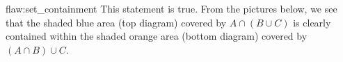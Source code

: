 \begin{flaw}{flaw:set_containment} 
This statement is true. From the pictures below, we see that the shaded blue area (top diagram) covered by $A \cap (B \cup C)$ is clearly contained within the shaded orange area (bottom diagram) covered by $(A \cap B) \cup C$.

\def\firstcircle{(0,0) circle (1.5cm)}
\def\secondcircle{(45:2cm) circle (1.5cm)}
\def\thirdcircle{(0:2cm) circle (1.5cm)}


\begin{center}
\end{center}


\begin{center}
\end{center}
\end{flaw}

